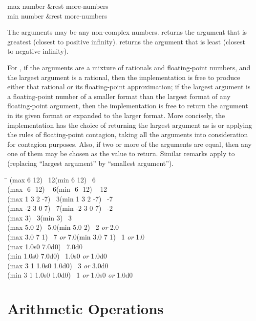 \begin{defun}[Function]
max number &rest more-numbers \\
min number &rest more-numbers

The arguments may be any non-complex numbers.
 returns the argument that is greatest (closest
to positive infinity).
 returns the argument that is least (closest to
negative infinity).

For ,
if the arguments are a mixture of rationals and floating-point
numbers, and the largest argument
is a rational, then the implementation is free to
produce either that rational or its floating-point approximation;
if the largest argument is a floating-point number of a smaller format
than the largest format of any floating-point argument,
then the implementation is free to
return the argument in its given format or expanded to the larger format.
More concisely, the implementation has the choice of returning the largest
argument as is or applying the rules of floating-point contagion,
taking all the arguments into consideration for contagion purposes.
Also, if two or more of the arguments are equal, then any one
of them may be chosen as the value to return.
Similar remarks apply to  (replacing ``largest argument'' by
``smallest argument'').

\begin{lisp}
\textwidth\=\kill
(max 6 12) \EV\ 12\>(min 6 12) \EV\ 6 \\
(max -6 -12) \EV\ -6\>(min -6 -12) \EV\ -12 \\
(max 1 3 2 -7) \EV\ 3\>(min 1 3 2 -7) \EV\ -7 \\
(max -2 3 0 7) \EV\ 7\>(min -2 3 0 7) \EV\ -2 \\
(max 3) \EV\ 3\>(min 3) \EV\ 3 \\
(max 5.0 2) \EV\ 5.0\>(min 5.0 2) \EV\ 2 {\it or} 2.0 \\
(max 3.0 7 1) \EV\ 7 {\it or} 7.0\>(min 3.0 7 1) \EV\ 1 {\it or} 1.0 \\
(max 1.0s0 7.0d0) \EV\ 7.0d0 \\
(min 1.0s0 7.0d0) \EV\ 1.0s0 {\it or} 1.0d0 \\
(max 3 1 1.0s0 1.0d0) \EV\ 3 {\it or} 3.0d0 \\
(min 3 1 1.0s0 1.0d0) \EV\ 1 {\it or} 1.0s0 {\it or} 1.0d0
\end{lisp}
\end{defun}

\section{Arithmetic Operations}

